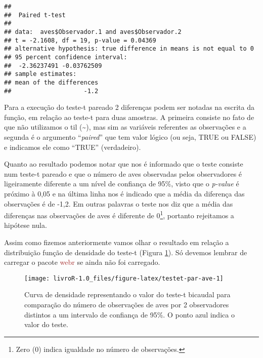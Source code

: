 \documentclass[14pt,titlepage, oneside, openany, a4paper]{book}
\newenvironment{Shaded}{\begin{snugshade}}{\end{snugshade}}
\newcommand{\DataTypeTok}[1]{\textcolor[rgb]{0.13,0.29,0.53}{#1}}
\newcommand{\FloatTok}[1]{\textcolor[rgb]{0.00,0.00,0.81}{#1}}
\newcommand{\KeywordTok}[1]{\textcolor[rgb]{0.13,0.29,0.53}{\textbf{#1}}}
\newcommand{\NormalTok}[1]{#1}
\newcommand{\OperatorTok}[1]{\textcolor[rgb]{0.81,0.36,0.00}{\textbf{#1}}}
\newcommand{\OtherTok}[1]{\textcolor[rgb]{0.56,0.35,0.01}{#1}}
\begin{document}
\begin{verbatim}
## 
##  Paired t-test
## 
## data:  aves$Observador.1 and aves$Observador.2
## t = -2.1608, df = 19, p-value = 0.04369
## alternative hypothesis: true difference in means is not equal to 0
## 95 percent confidence interval:
##  -2.36237491 -0.03762509
## sample estimates:
## mean of the differences 
##                    -1.2
\end{verbatim}

Para a execução do teste-t pareado 2 diferenças podem ser notadas na escrita da função, em relação ao teste-t para duas amostras. A primeira consiste no fato de que não utilizamos o til (\textasciitilde{}), mas sim as variáveis referentes as observações e a segunda é o argumento ``\emph{paired}'' que tem valor lógico (ou seja, TRUE ou FALSE) e indicamos ele como ``TRUE'' (verdadeiro).

Quanto ao resultado podemos notar que nos é informado que o teste consiste num teste-t pareado e que o número de aves observadas pelos observadores é ligeiramente diferente a um nível de confiança de 95\%, visto que o \emph{p-value} é próximo à 0,05 e na última linha nos é indicado que a média da diferença das observações é de -1,2. Em outras palavras o teste nos diz que a média das diferenças nas observações de aves é diferente de 0\footnote{Zero (0) indica igualdade no número de observações.}, portanto rejeitamos a hipótese nula.

Assim como fizemos anteriormente vamos olhar o resultado em relação a distribuição função de densidade do teste-t (Figura \ref{fig:testet-par-ave}). Só devemos lembrar de carregar o pacote \textcolor{brown}{webr} se ainda não foi carregado.

\begin{Shaded}
\end{Shaded}

\begin{figure}[H]

{\centering \texttt{[image: livroR-1.0\_files/figure-latex/testet-par-ave-1]} 

}

\caption{Curva de densidade representando o valor do teste-t bicaudal para comparação do número de observações de aves por 2 observadores distintos a um intervalo de confiança de 95\%. O ponto azul indica o valor do teste.}\label{fig:testet-par-ave}
\end{figure}
\end{document}
